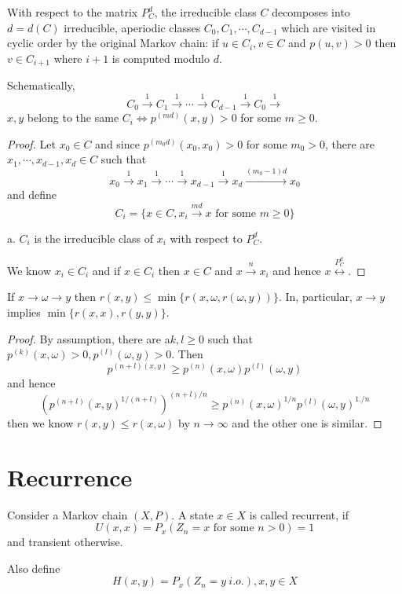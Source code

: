 \documentclass[lang=en, color=blue, ]{elegantbook}
\begin{document}
\begin{theorem}
    With respect to the matrix $P_C^d$, the irreducible class $C$ decomposes into $d=d(C)$ irreducible, aperiodic classes $C_0,C_1,\cdots,C_{d-1}$ which are visited in cyclic order by the original Markov chain: if $u\in C_i, v\in C$ and $p(u,v) > 0$ then $v\in C_{i+1}$ where $i+1$ is computed modulo $d$.\par
    Schematically,
    \[C_0\overset{1}{\rightarrow}C_1\overset{1}{\rightarrow}\cdots \overset{1}{\rightarrow}C_{d-1}\overset{1}{\rightarrow} C_0\overset{1}{\rightarrow}\]
    $x,y$ belong to the same $C_i\Leftrightarrow p^{(md)}(x,y) > 0$ for some $m\geq 0$.
\end{theorem}
\begin{proof}
    Let $x_0 \in C$ and since $p^{(m_0d)}(x_0,x_0) > 0$ for some $m_0 > 0$, there are $x_1,\cdots,x_{d-1},x_d\in C$ such that
    \[x_0 \overset{1}{\rightarrow} x_1 \overset{1}{\rightarrow} \cdots \overset{1}{\rightarrow} x_{d-1} \overset{1}{\rightarrow} x_d \overset{(m_0-1)d}{\rightarrow} x_0\]
    and define
    \[
    C_i = \{x\in C, x_i \overset{md}{\rightarrow} x\text{ for some }m\geq 0\}
    \]\par
    a. $C_i$ is the irreducible class of $x_i$ with respect to $P_C^d$.\par
    We know $x_i \in C_i$ and if $x\in C_i$ then $x\in C$ and $x\overset{n}{\rightarrow}x_i$ and hence $x\overset{P_C^d}{\leftrightarrow}$.
\end{proof}

\begin{lemma}
    If $x\to \omega\to y$ then $r(x,y) \leq \min\{r(x,\omega,r(\omega,y))\}$. In, particular, $x\to y$ implies $\min\{r(x,x),r(y,y)\}$.
\end{lemma}
\begin{proof}
    By assumption, there are a$k,l \geq 0$ such that $p^{(k)}(x,\omega) > 0,p^{(l)}(\omega,y) > 0$. Then
    \[
    p^{(n+l)(x,y)} \geq p^{(n)}(x,\omega)p^{(l)}(\omega,y)
    \]
    and hence
    \[(p^{(n+l)}(x,y)^{1/(n+l)})^{(n+l)/n} \geq p^{(n)}(x,\omega)^{1/n}p^{(l)}(\omega,y)^{1./n}\]
    then we know  $r(x,y) \leq r(x,\omega)$ by $n\to\infty$ and the other one is similar.
\end{proof}

\section{Recurrence}

\begin{definition}
    Consider a Markov chain $(X,P)$. A state $x\in X$ is called recurrent, if 
    \[U(x,x) = P_x(Z_n = x\text{ for some }n>0) = 1\]
    and transient otherwise.\par
    Also define
    \[H(x,y) = P_x(Z_n = y\ i.o.), x,y\in X\]
\end{definition}
\end{document}

